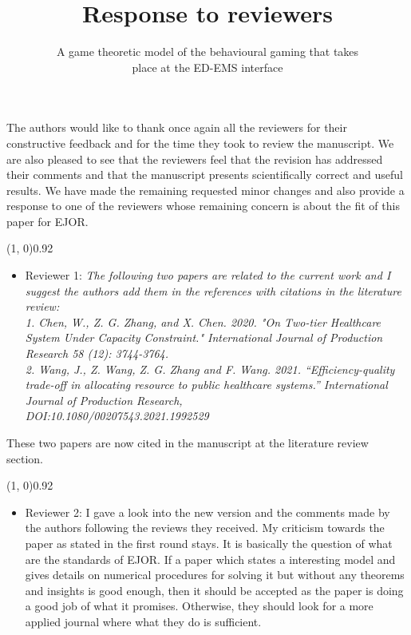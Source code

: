 \documentclass{article}
\title{Response to reviewers}
\author{A game theoretic model of the behavioural gaming that takes \\
place at the ED-EMS interface}
\begin{document}
    \maketitle

    The authors would like to thank once again all the reviewers for their
    constructive feedback and for
    the time they took to review the manuscript.
    We are also pleased to see that the reviewers feel that the revision has addressed their comments and that the manuscript presents scientifically correct and useful results.
    We have made the remaining requested minor changes and also provide a response to one of the 
    reviewers whose remaining concern is about the fit of this paper for EJOR.


    \line(1, 0){0.92\textwidth}
    \begin{itemize}
        \item Reviewer 1: \textit{The following two papers are related to the
        current work and I suggest the authors add them in the references with
        citations in the literature review: \\
        1. Chen, W., Z. G. Zhang, and X. Chen. 2020. "On Two-tier Healthcare
        System Under Capacity Constraint." International Journal of Production
        Research 58 (12): 3744-3764. \\
        2. Wang, J., Z. Wang, Z. G. Zhang and F. Wang. 2021.
        ``Efficiency-quality trade-off in allocating resource to public
        healthcare systems.'' International Journal of Production Research, \\
        DOI:10.1080/00207543.2021.1992529}
    \end{itemize}

    These two papers are now cited in the manuscript at the literature review
    section.

    \line(1, 0){0.92\textwidth}
    \begin{itemize}
        \item Reviewer 2: I gave a look into the new version and the comments
        made by the authors following the reviews they received.
        My criticism towards the paper as stated in the first round stays.
        It is basically the question of what are the standards of EJOR.
        If a paper which states a interesting model and gives details on
        numerical procedures for solving it but without any theorems and
        insights is good enough, then it should be accepted as the paper is
        doing a good job of what it promises.
        Otherwise, they should look for a more applied journal where what they
        do is sufficient.
    \end{itemize}
\end{document}
